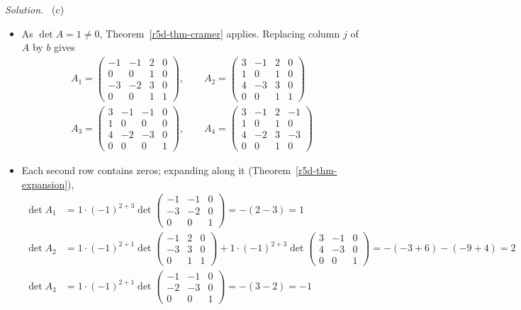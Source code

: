 \documentclass[12pt]{article}
\theoremstyle{definition}
\newenvironment{solution}{\par\noindent\textit{Solution.}\ }{\par\smallskip}
\begin{document}
\begin{solution}
(c)
\begin{itemize}
\item As \(\det A=1\ne0\), Theorem~\ref{r5d-thm-cramer} applies. Replacing column \(j\) of \(A\) by \(b\) gives
\[
\begin{gathered}
A_1=\begin{pmatrix}-1&-1&2&0\\0&0&1&0\\-3&-2&3&0\\0&0&1&1\end{pmatrix},\qquad
A_2=\begin{pmatrix}3&-1&2&0\\1&0&1&0\\4&-3&3&0\\0&0&1&1\end{pmatrix}\\
A_3=\begin{pmatrix}3&-1&-1&0\\1&0&0&0\\4&-2&-3&0\\0&0&0&1\end{pmatrix},\qquad
A_4=\begin{pmatrix}3&-1&2&-1\\1&0&1&0\\4&-2&3&-3\\0&0&1&0\end{pmatrix}
\end{gathered}
\]
\item Each second row contains zeros; expanding along it (Theorem~\ref{r5d-thm-expansion}),
\[
\begin{aligned}
\det A_1&=1\cdot(-1)^{2+3}\det\begin{pmatrix}-1&-1&0\\-3&-2&0\\0&0&1\end{pmatrix}=-(2-3)=1\\
\det A_2&=1\cdot(-1)^{2+1}\det\begin{pmatrix}-1&2&0\\-3&3&0\\0&1&1\end{pmatrix}
+1\cdot(-1)^{2+3}\det\begin{pmatrix}3&-1&0\\4&-3&0\\0&0&1\end{pmatrix}=-(-3+6)-(-9+4)=2\\
\det A_3&=1\cdot(-1)^{2+1}\det\begin{pmatrix}-1&-1&0\\-2&-3&0\\0&0&1\end{pmatrix}=-(3-2)=-1\\

\end{aligned}\]
\end{itemize}
\end{solution}
\end{document}
